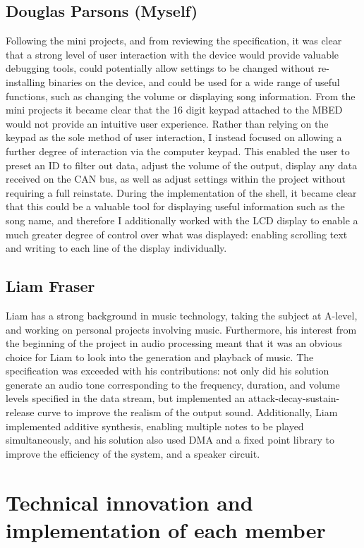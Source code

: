 \subsection*{Douglas Parsons (Myself)}
Following the mini projects, and from reviewing the specification, it was clear 
that a strong level of user interaction with the device would provide valuable 
debugging tools, could potentially allow settings to be changed without 
re-installing binaries on the device, and could be used for a wide range of 
useful functions, such as changing the volume or displaying song information. 
From the mini projects it became clear that the 16 digit keypad attached to the 
MBED would not provide an intuitive user experience. Rather than relying on 
the keypad as the sole method of user interaction, I instead focused 
on allowing a further degree of interaction via the computer keypad. This 
enabled the user to preset an ID to filter out data, adjust the volume of the 
output, display any data received on the CAN bus, as 
well as adjust settings within the project without requiring a full reinstate.
During the implementation of the shell, it became clear that this could be a 
valuable tool for displaying useful information such as the song name, and 
therefore I additionally worked with the LCD display to enable a much greater 
degree of control over what was displayed: enabling scrolling text and writing 
to each line of the display individually.

\subsection*{Liam Fraser}
Liam has a strong background in music technology, taking the subject at A-level,
and working on personal projects involving music. Furthermore, his interest from 
the beginning of the project in audio processing meant that it was an obvious 
choice for Liam to look into the generation and playback of music. The 
specification was exceeded with his contributions: not only did his solution 
generate an audio tone corresponding to the frequency, duration, and volume 
levels specified in the data stream, but implemented an attack-decay-sustain-release 
curve to improve the realism of the output sound. 
Additionally, Liam implemented additive synthesis, 
enabling multiple notes to be played simultaneously, and his solution also 
used DMA and a fixed point library to improve the efficiency of the system, and 
a speaker circuit.

\section{Technical innovation and implementation of each member}
